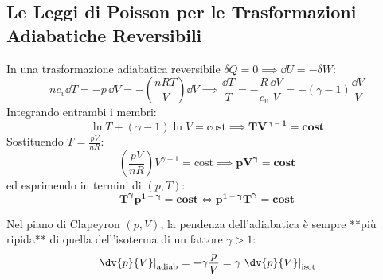 \subsection{Le Leggi di Poisson per le Trasformazioni Adiabatiche Reversibili}

In una trasformazione adiabatica reversibile $\delta Q = 0 \implies \dd U = -\delta W$:
\begin{equation}
    n c_v \dd T = -p\,\dd V = -\left(\frac{n R T}{V}\right)\dd V \implies \frac{\dd T}{T} = -\frac{R}{c_v}\frac{\dd V}{V} = -(\gamma - 1)\frac{\dd V}{V}
\end{equation}
Integrando entrambi i membri:
\begin{equation}
    \ln T + (\gamma - 1)\ln V = \text{cost} \implies \mathbf{T V^{\gamma - 1} = \text{cost}}
    \label{eq:poisson_tv}
\end{equation}
Sostituendo $T = \frac{p V}{n R}$:
\begin{equation}
    \left(\frac{p V}{n R}\right) V^{\gamma - 1} = \text{cost} \implies \mathbf{p V^\gamma = \text{cost}}
    \label{eq:poisson_pv}
\end{equation}
ed esprimendo in termini di $(p, T)$:
\begin{equation}
    \mathbf{T^\gamma p^{1 - \gamma} = \text{cost} \iff p^{1 - \gamma} T^\gamma = \text{cost}}
    \label{eq:poisson_tp}
\end{equation}

\begin{esame}
Nel piano di Clapeyron $(p, V)$, la pendenza dell'adiabatica è sempre **più ripida** di quella dell'isoterma di un fattore $\gamma > 1$:
\begin{equation}
    \left.\dv{p}{V}\right|_{\text{adiab}} = -\gamma \frac{p}{V} = \gamma \left.\dv{p}{V}\right|_{\text{isot}}
\end{equation}
\end{esame}
